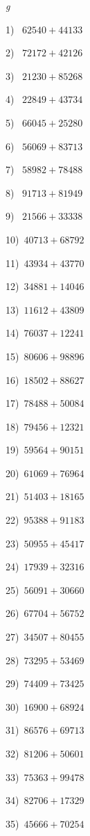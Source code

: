 \documentclass{article}
\begin{document}
 
\begin{center} 
   \large{\textit{g}} 
\end{center}\begin{multicols}{2}
1)$\,\,\,\,\,62540+44133$ \par 
2)$\,\,\,\,\,72172+42126$ \par 
3)$\,\,\,\,\,21230+85268$ \par 
4)$\,\,\,\,\,22849+43734$ \par 
5)$\,\,\,\,\,66045+25280$ \par 
6)$\,\,\,\,\,56069+83713$ \par 
7)$\,\,\,\,\,58982+78488$ \par 
8)$\,\,\,\,\,91713+81949$ \par 
9)$\,\,\,\,\,21566+33338$ \par 
10)$\,\,\,40713+68792$ \par 
11)$\,\,\,43934+43770$ \par 
12)$\,\,\,34881+14046$ \par 
13)$\,\,\,11612+43809$ \par 
14)$\,\,\,76037+12241$ \par 
15)$\,\,\,80606+98896$ \par 
16)$\,\,\,18502+88627$ \par 
17)$\,\,\,78488+50084$ \par 
18)$\,\,\,79456+12321$ \par 
19)$\,\,\,59564+90151$ \par 
20)$\,\,\,61069+76964$ \par 
21)$\,\,\,51403+18165$ \par 
22)$\,\,\,95388+91183$ \par 
23)$\,\,\,50955+45417$ \par 
24)$\,\,\,17939+32316$ \par 
25)$\,\,\,56091+30660$ \par 
26)$\,\,\,67704+56752$ \par 
27)$\,\,\,34507+80455$ \par 
28)$\,\,\,73295+53469$ \par 
29)$\,\,\,74409+73425$ \par 
30)$\,\,\,16900+68924$ \par 
31)$\,\,\,86576+69713$ \par 
32)$\,\,\,81206+50601$ \par 
33)$\,\,\,75363+99478$ \par 
34)$\,\,\,82706+17329$ \par 
35)$\,\,\,45666+70254$ \par 

\end{multicols}
\end{document}
